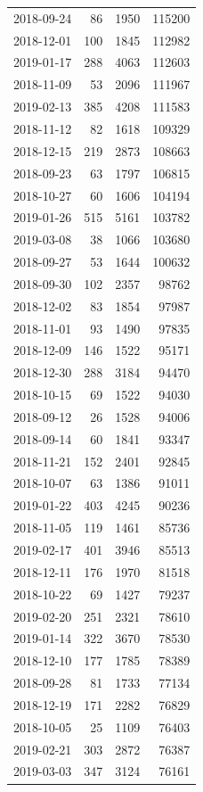 \begin{tabular}{lrrr}
2018-09-24 & 86 & 1950 & 115200 \\
2018-12-01 & 100 & 1845 & 112982 \\
2019-01-17 & 288 & 4063 & 112603 \\
2018-11-09 & 53 & 2096 & 111967 \\
2019-02-13 & 385 & 4208 & 111583 \\
2018-11-12 & 82 & 1618 & 109329 \\
2018-12-15 & 219 & 2873 & 108663 \\
2018-09-23 & 63 & 1797 & 106815 \\
2018-10-27 & 60 & 1606 & 104194 \\
2019-01-26 & 515 & 5161 & 103782 \\
2019-03-08 & 38 & 1066 & 103680 \\
2018-09-27 & 53 & 1644 & 100632 \\
2018-09-30 & 102 & 2357 & 98762 \\
2018-12-02 & 83 & 1854 & 97987 \\
2018-11-01 & 93 & 1490 & 97835 \\
2018-12-09 & 146 & 1522 & 95171 \\
2018-12-30 & 288 & 3184 & 94470 \\
2018-10-15 & 69 & 1522 & 94030 \\
2018-09-12 & 26 & 1528 & 94006 \\
2018-09-14 & 60 & 1841 & 93347 \\
2018-11-21 & 152 & 2401 & 92845 \\
2018-10-07 & 63 & 1386 & 91011 \\
2019-01-22 & 403 & 4245 & 90236 \\
2018-11-05 & 119 & 1461 & 85736 \\
2019-02-17 & 401 & 3946 & 85513 \\
2018-12-11 & 176 & 1970 & 81518 \\
2018-10-22 & 69 & 1427 & 79237 \\
2019-02-20 & 251 & 2321 & 78610 \\
2019-01-14 & 322 & 3670 & 78530 \\
2018-12-10 & 177 & 1785 & 78389 \\
2018-09-28 & 81 & 1733 & 77134 \\
2018-12-19 & 171 & 2282 & 76829 \\
2018-10-05 & 25 & 1109 & 76403 \\
2019-02-21 & 303 & 2872 & 76387 \\
2019-03-03 & 347 & 3124 & 76161 \\

\end{tabular}
